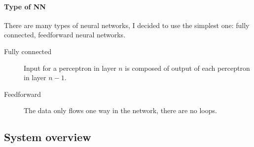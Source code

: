\documentclass[12pt,a4paper]{book}
\begin{document}
\paragraph{Type of NN}
There are many types of neural networks, I decided to use the simplest one: fully connected, feedforward neural networks.
\begin{description}
\item[Fully connected] Input for a perceptron in layer $n$ is composed of output of each perceptron in layer $n-1$.
\item[Feedforward] The data only flows one way in the network, there are no loops.
\end{description}

\subsection{System overview}
\end{document}
